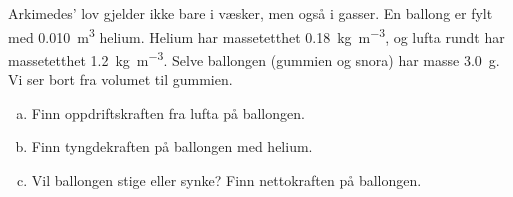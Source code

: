 %
Arkimedes' lov gjelder ikke bare i væsker, men også i gasser. En ballong er fylt med \SI{0.010}{\metre\cubed} helium. Helium har massetetthet \SI{0.18}{\kilo\gram\per\metre\cubed}, og lufta rundt har massetetthet \SI{1.2}{\kilo\gram\per\metre\cubed}. Selve ballongen (gummien og snora) har masse \SI{3.0}{\gram}. Vi ser bort fra volumet til gummien.
\begin{enumerate}[a)]
    \item Finn oppdriftskraften fra lufta på ballongen.
    \item Finn tyngdekraften på ballongen med helium.
    \item Vil ballongen stige eller synke? Finn nettokraften på ballongen.
\end{enumerate}
%
